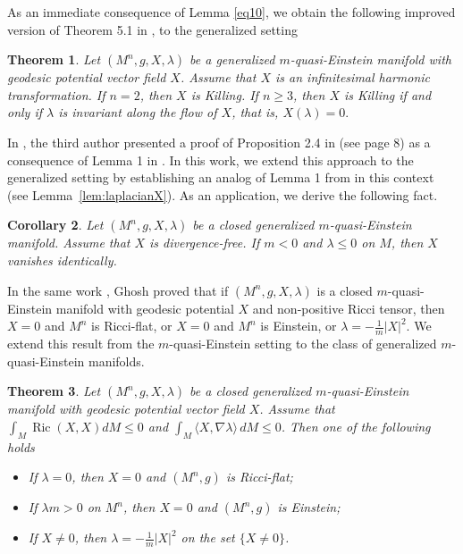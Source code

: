 \documentclass[a4paper, 12pt]{amsart}
\newtheorem{theo}{Theorem}
\newtheorem{cor}[theo]{Corollary}
\theoremstyle{definition}
\numberwithin{figure}{section}
\begin{document}
As an immediate consequence of Lemma \ref{eq10}, we obtain the following improved version of Theorem 5.1 in \cite{ghosh}, to the generalized setting

\begin{theo}\label{D}
Let $(M^n,g,X,\lambda)$ be a generalized $m$-quasi-Einstein manifold with geodesic potential vector field $X$. Assume that $X$ is an infinitesimal harmonic transformation. If $n=2$, then $X$ is Killing. If $n\geq 3$, then $X$ is Killing if and only if $\lambda$ is invariant along the flow of $X$, that is,
$ 
X(\lambda)=0.
$
\end{theo}


In \cite{CostaFilho2024}, the third author presented a proof of Proposition 2.4 in \cite{Bahuaud2024} (see page 8) as a consequence of Lemma 1 in \cite{BarrosRibeiro2014}. In this work, we extend this approach to the generalized setting by establishing an analog of Lemma 1 from \cite{BarrosRibeiro2014} in this context (see Lemma~\ref{lem:laplacianX}). As an application, we derive the following fact.

\begin{cor}
Let $(M^n, g, X, \lambda)$ be a closed generalized $m$-quasi-Einstein manifold.
Assume that $X$ is divergence-free.
If $m < 0$ and $\lambda \leq 0$ on $M$, then $X$ vanishes identically.
\end{cor}




In the same work \cite{ghosh}, Ghosh proved that if $(M^n,g,X,\lambda)$ is a closed $m$-quasi-Einstein manifold with geodesic potential $X$ and non-positive Ricci tensor, then $X=0$ and $M^n$ is Ricci-flat, or $X=0$ and $M^n$ is Einstein, or
$
\lambda = -\frac{1}{m}|X|^2.
$
We extend this result from the $m$-quasi-Einstein setting to the class of generalized $m$-quasi-Einstein manifolds.

\begin{theo}
Let $(M^{n}, g, X, \lambda)$ be a closed generalized $m$-quasi-Einstein
manifold with geodesic potential vector field $X$. Assume that  $\int_M \operatorname{Ric}(X,X) dM \le 0$ and
$\int_M \langle X,\nabla \lambda\rangle\, dM \le 0$.
Then one of the following holds
\begin{itemize}
    \item[(i)] If \(\lambda =0\), then \(X=0\) and \((M^n,g)\) is Ricci-flat;

    \item[(ii)] If \(\lambda m>0\) on \(M^n\), then \(X=0\) and \((M^n,g)\) is Einstein;

    \item[(iii)] If \(X\not=0\), then
    $    \lambda=-\frac1m|X|^2
    $
    on the set \(\{X\neq0\}\).
\end{itemize}
\end{theo}
\end{document}
